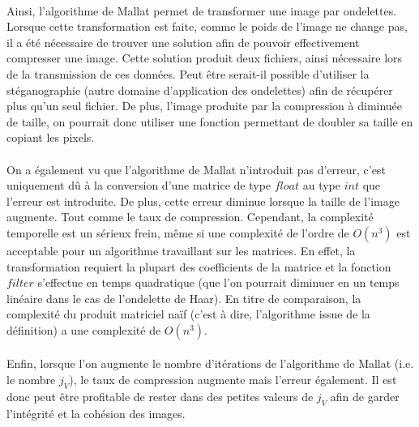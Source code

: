 \documentclass[a4paper,10pt]{report}
\theoremstyle{break}
\begin{document}
  \paragraph{} Ainsi, l'algorithme de Mallat permet de transformer une image par ondelettes. Lorsque cette transformation est faite,
      comme le poids de l'image ne change pas, il a \'{e}t\'{e} n\'{e}cessaire de trouver une solution afin de pouvoir effectivement
      compresser une image. Cette solution produit deux fichiers, ainsi n\'{e}cessaire lors de la transmission de ces donn\'{e}es.
      Peut \^{e}tre serait-il possible d'utiliser la st\'{e}ganographie (autre domaine d'application des ondelettes) afin de r\'{e}cup\'{e}rer 
      plus qu'un seul fichier. De plus, l'image produite par la compression \`{a} diminu\'{e}e de taille, on pourrait donc utiliser une 
      fonction permettant de doubler sa taille en copiant les pixels.
      
  \paragraph{} On a \'{e}galement vu que l'algorithme de Mallat n'introduit pas d'erreur, c'est uniquement d\^{u} \`{a} la conversion
      d'une matrice de type $float$ au type $int$ que l'erreur est introduite. De plus, cette erreur diminue lorsque la taille de l'image
      augmente. Tout comme le taux de compression. Cependant, la complexit\'{e} temporelle est un s\'{e}rieux frein, m\^{e}me si une 
      complexit\'{e} de l'ordre de $O(n^3)$ est acceptable pour un algorithme travaillant sur les matrices. En effet, la transformation
      requiert la plupart des coefficients de la matrice et la fonction $filter$ s'effectue en temps quadratique (que l'on pourrait
      diminuer en un temps lin\'{e}aire dans le cas de l'ondelette de Haar). En titre de comparaison, la complexit\'{e} du produit matriciel
      na\"{i}f (c'est \`{a} dire, l'algorithme issue de la d\'{e}finition) a une complexit\'{e} de $O(n^3)$.
      
  \paragraph{} Enfin, lorsque l'on augmente le nombre d'it\'{e}rations de l'algorithme de Mallat (i.e. le nombre $j_V$),
      le taux de compression augmente mais l'erreur \'{e}galement. Il est donc peut \^{e}tre profitable de rester dans des petites
      valeurs de $j_V$ afin de garder l'int\'{e}grit\'{e} et la coh\'{e}sion des images.
      
\end{document}
